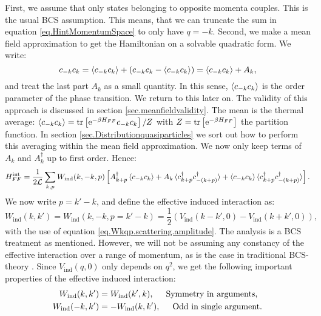 First, we assume that only states belonging to opposite momenta couples. This is the usual BCS assumption. This means, that we can truncate the sum in equation \eqref{eq.HintMomentumSpace} to only have $q = -k$. Second, we make a mean field approximation to get the Hamiltonian on a solvable quadratic form. We write:
\begin{equation}
c_{-k}c_{k} = \braket{ c_{-k}c_{k} } + \left(c_{-k} c_{k} - \braket{ c_{-k}c_{k} } \right) = \braket{ c_{-k}c_{k} } + A_k, \nonumber 
\end{equation}
and treat the last part $A_k$ as a small quantity. In this sense, $\braket{ c_{-k}c_{k} }$ is the order parameter of the phase transition. We return to this later on. The validity of this approach is discussed in section \ref{sec.meanfieldvalidity}. The mean is the thermal average: $\braket{ c_{-k}c_{k} } = \operatorname{tr}\left[\text{e}^{-\beta H_{FF}}c_{-k}c_{k} \right]/Z$ with $Z = \operatorname{tr}\left[\text{e}^{-\beta H_{FF}}\right]$ the partition function. In section \ref{sec.Distributionquasiparticles} we sort out how to perform this averaging within the mean field approximation. We now only keep terms of $A_k$ and $A^\dagger_k$ up to first order. Hence:
\begin{equation}
H^\text{int}_{FF} = \frac{1}{2\mathcal{L}} \sum_{k, p} W_{\text{ind}}(k, -k, p)\left[A^\dagger_{k + p}\braket{c_{-k}c_k} + A_{k}\braket{c^\dagger_{k + p}c^\dagger_{-(k+p)}} + \braket{c_{-k}c_k}\braket{c^\dagger_{k + p}c^\dagger_{-(k + p)}}\right]. \nonumber
\end{equation}
We now write $p = k' - k$, and define the effective induced interaction as:
\begin{equation}
W_{\text{ind}}(k, k') = W_{\text{ind}}(k, -k, p = k' - k) = \frac{1}{2}\left(V_{\text{ind}}\left( k - k', 0 \right) - V_{\text{ind}}\left( k + k', 0 \right) \right), 
\label{eq.EffectiveInteraction}
\end{equation}
with the use of equation \eqref{eq.Wkqp.scattering.amplitude}. The analysis is a BCS treatment as mentioned. However, we will not be assuming any constancy of the effective interaction over a range of momentum, as is the case in traditional BCS-theory \cite[chapter 3]{Tinkham}. Since $V_{\text{ind}}(q,0)$ only depends on $q^2$, we get the following important properties of the effective induced interaction: 
\begin{align}
W_{\text{ind}}(k,k') &= W_{\text{ind}}(k',k),   \hspace{0.5cm} \text{Symmetry in arguments}, \nonumber \\
W_{\text{ind}}(-k,k') &= -W_{\text{ind}}(k,k'), \hspace{0.5cm} \text{Odd in single argument}.
\label{eq.EffectiveInteractionSymmetries}
\end{align}
